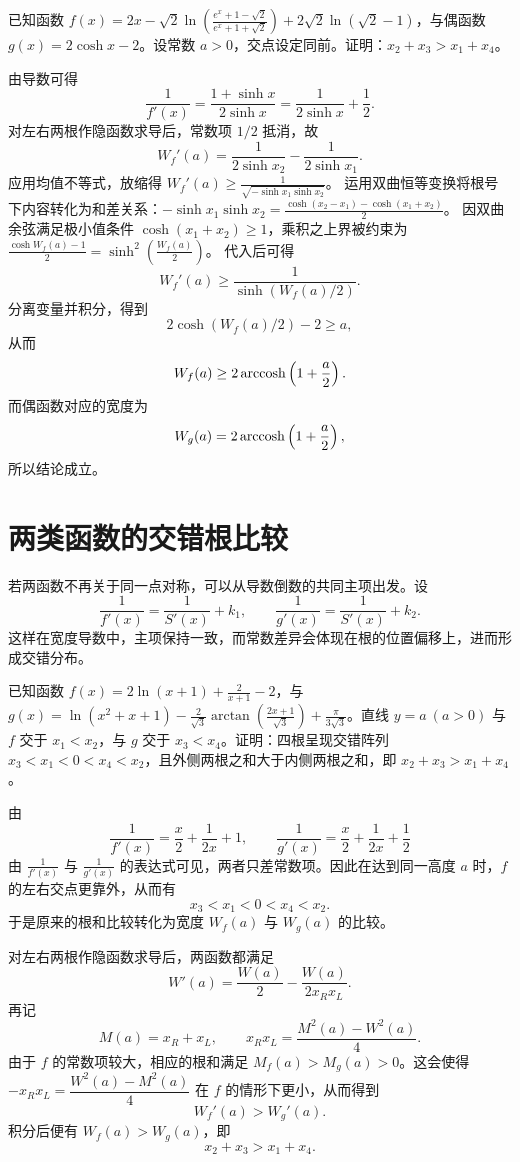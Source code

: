 \begin{example}
已知函数 $f(x) = 2x - \sqrt{2}\ln\left( \frac{e^x+1-\sqrt{2}}{e^x+1+\sqrt{2}} \right) + 2\sqrt{2}\ln(\sqrt{2}-1)$，与偶函数 $g(x) = 2\cosh x - 2$。设常数 $a > 0$，交点设定同前。证明：$x_2 + x_3 > x_1 + x_4$。
\end{example}

\begin{solution}
由导数可得
\[
\frac{1}{f'(x)} = \frac{1+\sinh x}{2\sinh x} = \frac{1}{2\sinh x} + \frac{1}{2}.
\]
对左右两根作隐函数求导后，常数项 $1/2$ 抵消，故
\[
W_f'(a) = \frac{1}{2\sinh x_2} - \frac{1}{2\sinh x_1}.
\]
应用均值不等式，放缩得 $W_f'(a) \ge \frac{1}{\sqrt{-\sinh x_1 \sinh x_2}}$。
运用双曲恒等变换将根号下内容转化为和差关系：$ -\sinh x_1 \sinh x_2 = \frac{\cosh(x_2-x_1) - \cosh(x_1+x_2)}{2} $。
因双曲余弦满足极小值条件 $\cosh(x_1+x_2) \ge 1$，乘积之上界被约束为 $\frac{\cosh W_f(a) - 1}{2} = \sinh^2\left(\frac{W_f(a)}{2}\right)$。
代入后可得
\[
W_f'(a) \ge \frac{1}{\sinh(W_f(a)/2)}.
\]
分离变量并积分，得到
\[
2\cosh(W_f(a)/2)-2 \ge a,
\]
从而
\[
W_f(a) \ge 2\operatorname{arccosh}\left(1+\frac{a}{2}\right).
\]
而偶函数对应的宽度为
\[
W_g(a) = 2\operatorname{arccosh}\left(1+\frac{a}{2}\right),
\]
所以结论成立。
\end{solution}

\section{两类函数的交错根比较}

若两函数不再关于同一点对称，可以从导数倒数的共同主项出发。设
\[
\frac{1}{f'(x)} = \frac{1}{S'(x)} + k_1,\qquad
\frac{1}{g'(x)} = \frac{1}{S'(x)} + k_2.
\]
这样在宽度导数中，主项保持一致，而常数差异会体现在根的位置偏移上，进而形成交错分布。

\begin{example}
已知函数 $f(x) = 2\ln(x+1) + \frac{2}{x+1} - 2$，与 $g(x) = \ln(x^2+x+1) - \frac{2}{\sqrt{3}}\arctan\left(\frac{2x+1}{\sqrt{3}}\right) + \frac{\pi}{3\sqrt{3}}$。直线 $y=a \ (a>0)$ 与 $f$ 交于 $x_1 < x_2$，与 $g$ 交于 $x_3 < x_4$。证明：四根呈现交错阵列 $x_3 < x_1 < 0 < x_4 < x_2$，且外侧两根之和大于内侧两根之和，即 $x_2 + x_3 > x_1 + x_4$。
\end{example}

\begin{solution}
由
\[
\frac{1}{f'(x)} = \frac{x}{2} + \frac{1}{2x} + 1,
\qquad
\frac{1}{g'(x)} = \frac{x}{2} + \frac{1}{2x} + \frac{1}{2}
\]
由 \(\frac1{f'(x)}\) 与 \(\frac1{g'(x)}\) 的表达式可见，两者只差常数项。因此在达到同一高度 \(a\) 时，\(f\) 的左右交点更靠外，从而有
\[
x_3 < x_1 < 0 < x_4 < x_2.
\]
于是原来的根和比较转化为宽度 $W_f(a)$ 与 $W_g(a)$ 的比较。

对左右两根作隐函数求导后，两函数都满足
\[
W'(a) = \frac{W(a)}{2} - \frac{W(a)}{2x_Rx_L}.
\]
再记
\[
M(a)=x_R+x_L,
\qquad
x_Rx_L=\frac{M^2(a)-W^2(a)}{4}.
\]
由于 $f$ 的常数项较大，相应的根和满足 $M_f(a)>M_g(a)>0$。这会使得 $-x_Rx_L=\dfrac{W^2(a)-M^2(a)}{4}$ 在 $f$ 的情形下更小，从而得到
\[
W_f'(a)>W_g'(a).
\]
积分后便有 $W_f(a)>W_g(a)$，即
\[
x_2 + x_3 > x_1 + x_4.
\]
\end{solution}

